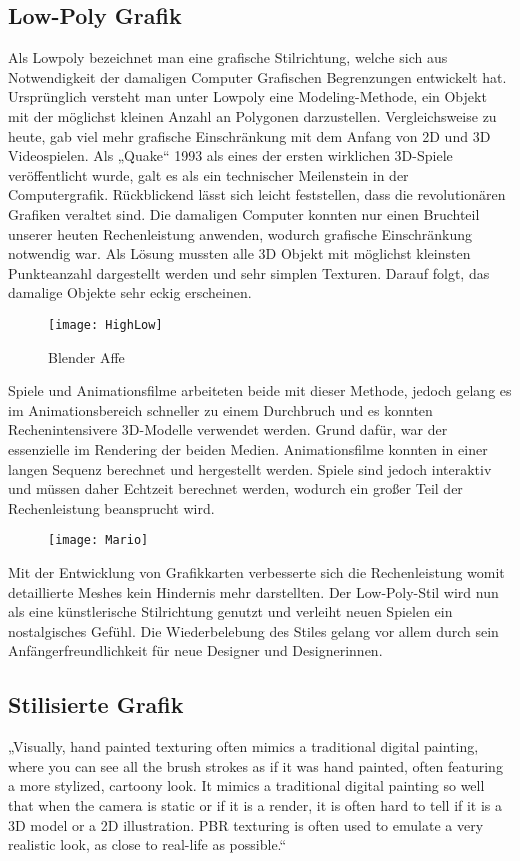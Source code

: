 \subsection{Low-Poly Grafik}

Als Lowpoly bezeichnet man eine grafische Stilrichtung, welche sich aus Notwendigkeit der damaligen Computer Grafischen Begrenzungen entwickelt hat. Ursprünglich versteht man unter Lowpoly eine Modeling-Methode, ein Objekt mit der möglichst kleinen Anzahl an Polygonen darzustellen. Vergleichsweise zu heute, gab viel mehr grafische Einschränkung mit dem Anfang von 2D und 3D Videospielen. Als „Quake“ 1993 als eines der ersten wirklichen 3D-Spiele veröffentlicht wurde, galt es als ein technischer Meilenstein in der Computergrafik. Rückblickend lässt sich leicht feststellen, dass die revolutionären Grafiken veraltet sind. Die damaligen Computer konnten nur einen Bruchteil unserer heuten Rechenleistung anwenden, wodurch grafische Einschränkung notwendig war. Als Lösung mussten alle 3D Objekt mit möglichst kleinsten Punkteanzahl dargestellt werden und sehr simplen Texturen. Darauf folgt, das damalige Objekte sehr eckig erscheinen.


\begin{figure}[H]
	\centerfirst
	\texttt{[image: HighLow]}
	\caption{Blender Affe}
\end{figure}


Spiele und Animationsfilme arbeiteten beide mit dieser Methode, jedoch gelang es im Animationsbereich schneller zu einem Durchbruch und es konnten Rechenintensivere 3D-Modelle verwendet werden. Grund dafür, war der essenzielle im Rendering der beiden Medien. Animationsfilme konnten in einer langen Sequenz berechnet und hergestellt werden. Spiele sind jedoch interaktiv und müssen daher Echtzeit berechnet werden, wodurch ein großer Teil der Rechenleistung beansprucht wird.

\begin{figure}[H]
	\centering
	\texttt{[image: Mario]}
	\caption{\cite{_mario}}
\end{figure}

Mit der Entwicklung von Grafikkarten verbesserte sich die Rechenleistung womit detaillierte Meshes kein Hindernis mehr darstellten. Der Low-Poly-Stil wird nun als eine künstlerische Stilrichtung genutzt und verleiht neuen Spielen ein nostalgisches Gefühl. Die Wiederbelebung des Stiles gelang vor allem durch sein Anfängerfreundlichkeit für neue Designer und Designerinnen. 

\subsection{Stilisierte Grafik}

„Visually, hand painted texturing often mimics a traditional digital painting, where you can see all the brush strokes as if it was hand painted, often featuring a more stylized, cartoony look. It mimics a traditional digital painting so well that when the camera is static or if it is a render, it is often hard to tell if it is a 3D model or a 2D illustration. PBR texturing is often used to emulate a very realistic look, as close to real-life as possible.“	\cite{_stylisedArt}



